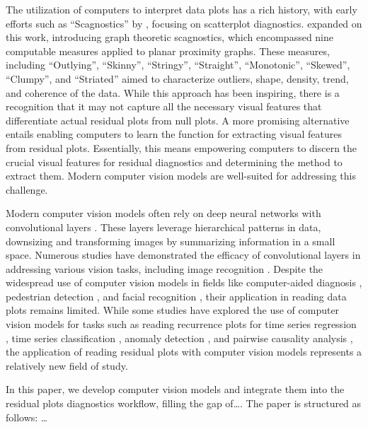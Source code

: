 \documentclass[]{interact}
\theoremstyle{plain}%
\theoremstyle{definition}
\theoremstyle{remark}
\begin{document}
The utilization of computers to interpret data plots has a rich history,
with early efforts such as ``Scagnostics'' by \citet{tukey1985computer},
focusing on scatterplot diagnostics. \citet{wilkinson2005graph} expanded
on this work, introducing graph theoretic scagnostics, which encompassed
nine computable measures applied to planar proximity graphs. These
measures, including ``Outlying'', ``Skinny'', ``Stringy'', ``Straight'',
``Monotonic'', ``Skewed'', ``Clumpy'', and ``Striated'' aimed to
characterize outliers, shape, density, trend, and coherence of the data.
While this approach has been inspiring, there is a recognition
\citep{buja2009statistical} that it may not capture all the necessary
visual features that differentiate actual residual plots from null
plots. A more promising alternative entails enabling computers to learn
the function for extracting visual features from residual plots.
Essentially, this means empowering computers to discern the crucial
visual features for residual diagnostics and determining the method to
extract them. Modern computer vision models are well-suited for
addressing this challenge.

Modern computer vision models often rely on deep neural networks with
convolutional layers \citep{fukushima1982neocognitron}. These layers
leverage hierarchical patterns in data, downsizing and transforming
images by summarizing information in a small space. Numerous studies
have demonstrated the efficacy of convolutional layers in addressing
various vision tasks, including image recognition \citep{rawat2017deep}.
Despite the widespread use of computer vision models in fields like
computer-aided diagnosis \citep{lee2015image}, pedestrian detection
\citep{brunetti2018computer}, and facial recognition
\citep{emami2012facial}, their application in reading data plots remains
limited. While some studies have explored the use of computer vision
models for tasks such as reading recurrence plots for time series
regression \citep{ojeda2020multivariate}, time series classification
\citep{chu2019automatic, hailesilassie2019financial, hatami2018classification, zhang2020encoding},
anomaly detection \citep{chen2020convolutional}, and pairwise causality
analysis \citep{singh2017deep}, the application of reading residual
plots with computer vision models represents a relatively new field of
study.

In this paper, we develop computer vision models and integrate them into
the residual plots diagnostics workflow, filling the gap of\ldots. The
paper is structured as follows: \ldots{}
\end{document}
